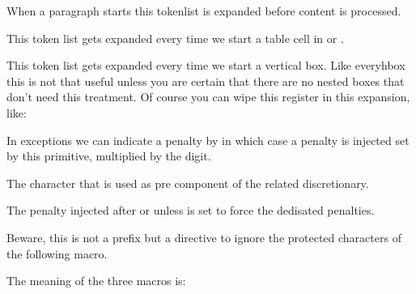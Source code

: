 \stopnewprimitive

\startoldprimitive[title={\prm {everypar}}]

When a paragraph starts this tokenlist is expanded before content is processed.

\stopoldprimitive

\startnewprimitive[title={\prm {everytab}}]

This token list gets expanded every time we start a table cell in  or
.

\stopnewprimitive

\startoldprimitive[title={\prm {everyvbox}}]

This token list gets expanded every time we start a vertical box. Like \prm
{everyhbox} this is not that useful unless you are certain that there are no
nested boxes that don't need this treatment. Of course you can wipe this register
in this expansion, like:

\starttyping
\everyvbox{\kern10pt\everyvbox{}}
\stoptyping

\stopoldprimitive

\startnewprimitive[title={\prm {exceptionpenalty}}]

In exceptions we can indicate a penalty by \type {[digit]} in which case a
penalty is injected set by this primitive, multiplied by the digit.

\stopnewprimitive

\startoldprimitive[title={\prm {exhyphenchar}}]

The character that is used as pre component of the related discretionary.

\stopoldprimitive

\startoldprimitive[title={\prm {exhyphenpenalty}}]

The penalty injected after \type {-} or \type {\-} unless 
is set to force the dedisated penalties.

\stopoldprimitive

\startnewprimitive[title={\prm {expand}}]

Beware, this is not a prefix but a directive to ignore the protected characters of
the following macro.

\startbuffer
\protected \def \testa{\the\scratchcounter}
           \edef\testb{\testa}
           \edef\testc{\expand\testa}
\stopbuffer

\typebuffer

The meaning of the three macros is:

